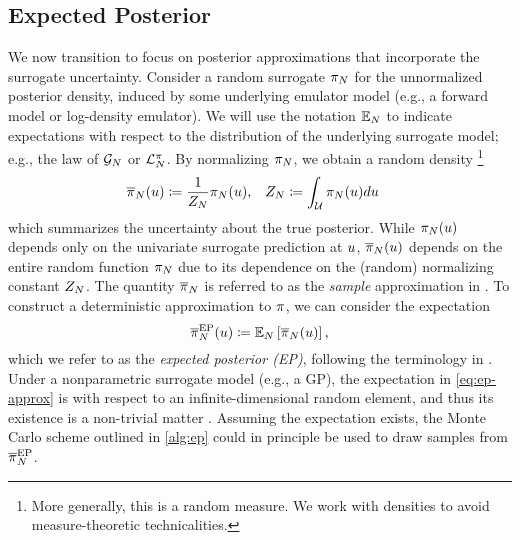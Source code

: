 \documentclass[12pt]{article}
\begin{document}
\subsection{Expected Posterior}
We now transition to focus on posterior approximations that incorporate the surrogate uncertainty.
Consider a random surrogate $\postEm[\Ndesign]$ for the unnormalized posterior density, 
induced by some underlying emulator model (e.g., a forward model or log-density emulator).
We will use the notation $\E_{\Ndesign}$ to indicate expectations with respect to the 
distribution of the underlying surrogate model; e.g., the law of $\fwdEm[\Ndesign]$ or $\lpostEm[\Ndesign]$.
By normalizing $\postEm[\Ndesign]$, we obtain a random density
\footnote{More generally, this is a random measure. We work with densities to avoid measure-theoretic technicalities.}
\begin{align}
&\postNormEm[\Ndesign](\Par) 
\Def \frac{1}{\llikEmRdm[\Ndesign]{\normCst}} \postEm[\Ndesign](\Par),
&&\normCstEm[\Ndesign]\Def \int_{\parSpace} \postEm[\Ndesign](\Par) d\Par
\label{eq:sample-approx}
\end{align}
which summarizes the uncertainty about the true posterior. 
While $\postEm[\Ndesign](\Par)$ depends 
only on the univariate surrogate prediction at $\Par$, $\llikEmRdm[\Ndesign]{\postDensNorm}(\Par)$
depends on the entire random function $\llikEmRdmDens[\Ndesign]$ due to its dependence on 
the (random) normalizing constant $\llikEmRdm[\Ndesign]{\normCst}$. The quantity
$\llikEmRdm[\Ndesign]{\postDensNorm}$ is referred to as the \textit{sample} approximation in
\citet{StuartTeck1, StuartTeck2,random_fwd_models,TeckHyperpar}.
To construct a deterministic approximation to $\postDens$, we can consider the expectation
\begin{equation}
\postApproxEP[\Ndesign](\Par) \Def \E_{\Ndesign}\left[\postNormEm[\Ndesign](\Par) \right], \label{eq:ep-approx}
\end{equation}
which we refer to as the \textit{expected posterior (EP)}, following the terminology in \citet{BurknerSurrogate}.
Under a nonparametric surrogate model (e.g., a GP), the expectation in \cref{eq:ep-approx} is with 
respect to an infinite-dimensional random element, and thus its existence is a non-trivial matter \citep{StuartTeck1}.
Assuming the expectation exists, the Monte Carlo scheme outlined in \cref{alg:ep} could in principle 
be used to draw samples from $\llikEmSampDensNorm$. 
\end{document}
